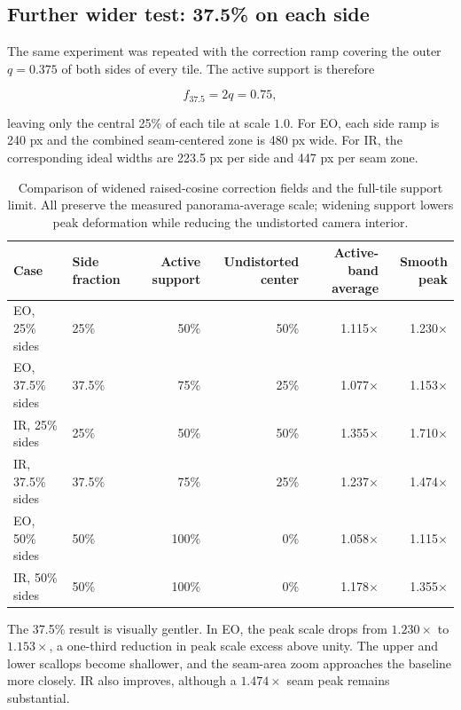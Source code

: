 \documentclass[10pt]{article}
\begin{document}
\subsection{Further wider test: 37.5\% on each side}

The same experiment was repeated with the correction ramp covering the outer $q=0.375$ of both sides of every tile. The active support is therefore

\begin{equation}
f_{37.5}=2q=0.75,
\end{equation}

leaving only the central 25\% of each tile at scale $1.0$. For EO, each side ramp is 240 px and the combined seam-centered zone is 480 px wide. For IR, the corresponding ideal widths are 223.5 px per side and 447 px per seam zone.

\begin{table}[H]
\centering
\caption{Comparison of widened raised-cosine correction fields and the full-tile support limit. All preserve the measured panorama-average scale; widening support lowers peak deformation while reducing the undistorted camera interior.}
\label{tab:wide-tile-comparison}
\small
\begin{tabular}{@{}llrrrr@{}}
\toprule
Case & Side fraction & Active support & Undistorted center & Active-band average & Smooth peak \\
\midrule
EO, 25\% sides & 25\% & 50\% & 50\% & 1.115$\times$ & 1.230$\times$ \\
EO, 37.5\% sides & 37.5\% & 75\% & 25\% & 1.077$\times$ & 1.153$\times$ \\
IR, 25\% sides & 25\% & 50\% & 50\% & 1.355$\times$ & 1.710$\times$ \\
IR, 37.5\% sides & 37.5\% & 75\% & 25\% & 1.237$\times$ & 1.474$\times$ \\
EO, 50\% sides & 50\% & 100\% & 0\% & 1.058$\times$ & 1.115$\times$ \\
IR, 50\% sides & 50\% & 100\% & 0\% & 1.178$\times$ & 1.355$\times$ \\
\bottomrule
\end{tabular}
\end{table}

The 37.5\% result is visually gentler. In EO, the peak scale drops from $1.230\times$ to $1.153\times$, a one-third reduction in peak scale excess above unity. The upper and lower scallops become shallower, and the seam-area zoom approaches the baseline more closely. IR also improves, although a $1.474\times$ seam peak remains substantial.
\end{document}
